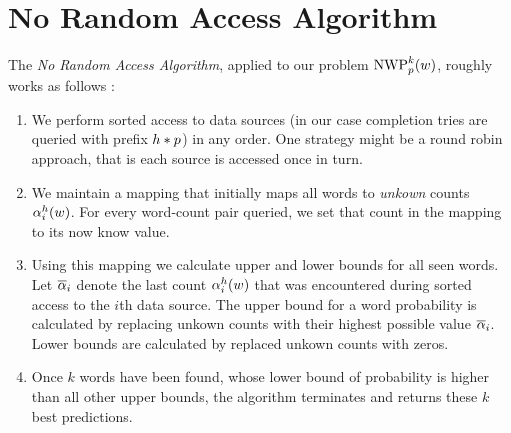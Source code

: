 \section{No Random Access Algorithm}
\label{sec:norandomaccessalgorithm}

The \emph{No Random Access Algorithm}, applied to our problem $\NWP[p][k](w)$,
roughly works as follows \parencite{Fagin2001}:
\begin{enumerate}
  \item We perform sorted access to data sources (in our case completion tries
    are queried with prefix $h * p$) in any order.
    One strategy might be a round robin approach, that is each source is
    accessed once in turn.
  \item We maintain a mapping that initially maps all words to \emph{unkown}
    counts $\alpha^h_i(w)$.
    For every word-count pair queried, we set that count in the mapping to its
    now know value.
  \item Using this mapping we calculate upper and lower bounds for all seen
    words.
    Let $\overline{\alpha}_i$ denote the last count $\alpha^h_i(w)$ that
    was encountered during sorted access to the $i$th data source.
    The upper bound for a word probability is calculated by replacing unkown
    counts with their highest possible value $\overline{\alpha}_i$.
    Lower bounds are calculated by replaced unkown counts with zeros.
  \item Once $k$ words have been found, whose lower bound of probability is
    higher than all other upper bounds, the algorithm terminates and returns
    these $k$ best predictions.
\end{enumerate}

